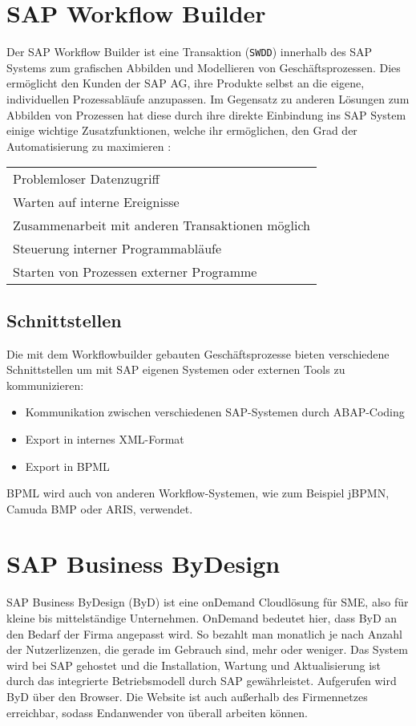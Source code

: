 \documentclass{handout}
\begin{document}
\section{SAP Workflow Builder}
Der SAP Workflow Builder ist eine Transaktion (\texttt{SWDD}) innerhalb des SAP Systems zum grafischen Abbilden und Modellieren von Geschäftsprozessen. Dies ermöglicht den Kunden der SAP AG, ihre Produkte selbst an die eigene, individuellen Prozessabläufe anzupassen. Im Gegensatz zu anderen Lösungen zum Abbilden von Prozessen hat diese durch ihre direkte Einbindung ins SAP System einige wichtige Zusatzfunktionen, welche ihr ermöglichen, den Grad der Automatisierung zu maximieren \cite{SAPHelpWf}:

\small
\begin{tabular}{L}
Problemloser Datenzugriff\\
Warten auf interne Ereignisse\\
Zusammenarbeit mit anderen Transaktionen möglich\\
Steuerung interner Programmabläufe\\
Starten von Prozessen externer Programme
\end{tabular}
\normalsize


\subsection{Schnittstellen}

Die mit dem Workflowbuilder gebauten Geschäftsprozesse bieten verschiedene Schnittstellen um mit SAP eigenen Systemen oder externen Tools zu kommunizieren:

\begin{itemize}
\item Kommunikation zwischen verschiedenen SAP-Systemen durch ABAP-Coding
\item Export in internes XML-Format
\item Export in BPML
\end{itemize}

BPML wird auch von anderen Workflow-Systemen, wie zum Beispiel jBPMN, Camuda BMP oder ARIS, verwendet.

\section{SAP Business ByDesign}

SAP Business ByDesign (ByD) ist eine onDemand Cloudlösung für SME, also für kleine bis mittelständige Unternehmen. OnDemand bedeutet hier, dass ByD an den Bedarf der Firma angepasst wird. So bezahlt man monatlich je nach Anzahl der Nutzerlizenzen, die gerade im Gebrauch sind, mehr oder weniger. Das System wird bei SAP gehostet und die Installation, Wartung und Aktualisierung ist durch das integrierte Betriebsmodell durch SAP gewährleistet. Aufgerufen wird ByD über den Browser. Die Website ist auch außerhalb des Firmennetzes erreichbar, sodass Endanwender von überall arbeiten können.
\end{document}
